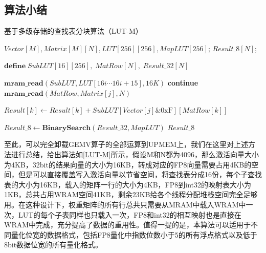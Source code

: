 \subsection{算法小结}

\begin{algorithm}[!htbp]
    \caption{基于多级存储的查找表分块算法（LUT-M）}
    \label{LUT-M}
    \begin{algorithmic}[1]
        \Require $Vector[M], Matrix[M][N], LUT[256][256], MapLUT[256]$; %
        \Ensure $Result\_8[N]$; %

        \State $\textbf{define}\; SubLUT[16][256],\;MatRow[N],\;Result\_32[N]$

            \State $\textbf{mram\_read}(SubLUT, LUT[16i \cdots 16i + 15], 16K)$
            \Comment{\textcolor{blue}{parallel read}}
                    \State \textbf{continue}
                \EndIf
                \State $\textbf{mram\_read}(MatRow, Matrix[j], N)$
                \Comment{\textcolor{blue}{parallel in N for each tasklet}}
                
                \Comment{\textcolor{blue}{parallel in N for each tasklet}}
                    \State $Result[k] \gets Result[k] + SubLUT[Vector[j] \& \text{0xF}][MatRow[k]]$
                \EndFor
            \EndFor
        \EndFor

        \State $Result\_8 \gets \textbf{BinarySearch}(Result\_32, MapLUT)$
        \Comment{\textcolor{blue}{parallel in N}}
        \State \Return $Result\_8$
    \end{algorithmic}
\end{algorithm}

至此，可以完全卸载GEMV算子的全部运算到UPMEM上，我们在这里对上述方法进行总结，给出算法如\ref{LUT-M}所示，假设M和N都为4096，那么激活向量大小为4KB，32bit的结果向量的大小为16KB，转成对应的FP8向量需要占用4KB的空间，但是可以直接覆盖写入激活向量以节省空间，将查找表分成16份，每个子查找表的大小为16KB，载入的矩阵一行的大小为4KB，FP8到int32的映射表大小为1KB，总共占用WRAM空间41KB，剩余23KB给各个线程分配堆栈空间完全足够用。在这种设计下，权重矩阵的所有行总共只需要从MRAM中载入WRAM中一次，LUT的每个子表同样也只载入一次，FP8和int32的相互映射也是直接在WRAM中完成，充分提高了数据的重用性。值得一提的是，本算法可以适用于不同量化位宽的数据格式，包括FP8量化中指数位数小于5的所有浮点格式以及低于8bit数据位宽的所有量化格式。

